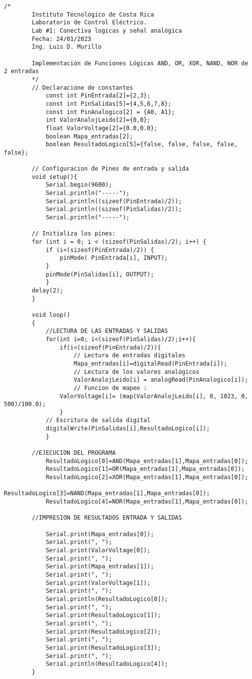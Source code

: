 {\scriptsize 
		
	\begin{lstlisting}[language=Arduino,numbers=none, showstringspaces=false]
		 /*
		Instituto Tecnológico de Costa Rica
		Laboratorio de Control Eléctrico.
		Lab #1: Conectiva logicas y señal analógica
		Fecha: 24/01/2023
		Ing. Luis D. Murillo
		
		Implementación de Funciones Lógicas AND, OR, XOR, NAND, NOR de 2 entradas
		*/
		// Declaracione de constantes
			const int PinEntrada[2]={2,3};
			const int PinSalidas[5]={4,5,6,7,8};
			const int PinAnalogico[2] = {A0, A1};
			int ValorAnalojLeido[2]={0,0};
			float ValorVoltage[2]={0.0,0.0};
			boolean Mapa_entradas[2];
			boolean ResultadoLogico[5]={false, false, false, false, false};
		
		// Configuracion de Pines de entrada y salida
		void setup(){
			Serial.begin(9600);
			Serial.println("-----");
			Serial.println((sizeof(PinEntrada)/2));
			Serial.println((sizeof(PinSalidas)/2));
			Serial.println("-----");
		
		// Initializa los pines:
		for (int i = 0; i < (sizeof(PinSalidas)/2); i++) {
			if (i<(sizeof(PinEntrada)/2)) {
				pinMode( PinEntrada[i], INPUT);
			}
			pinMode(PinSalidas[i], OUTPUT);
			}
		delay(2);
		}
		
		void loop()
		{		
			//LECTURA DE LAS ENTRADAS Y SALIDAS 	
			for(int i=0; i<(sizeof(PinSalidas)/2);i++){
				if(i<(sizeof(PinEntrada)/2)){
					// Lectura de entradas digitales
					Mapa_entradas[i]=digitalRead(PinEntrada[i]);
					// Lectura de los valores analógicos
					ValorAnalojLeido[i] = analogRead(PinAnalogico[i]);
					// Funcion de mapeo :
				ValorVoltage[i]= (map(ValorAnalojLeido[i], 0, 1023, 0, 500)/100.0);
				}
			// Escritura de salida digital
			digitalWrite(PinSalidas[i],ResultadoLogico[i]);
			}
		
		//EJECUCION DEL PROGRAMA
			ResultadoLogico[0]=AND(Mapa_entradas[1],Mapa_entradas[0]);
			ResultadoLogico[1]=OR(Mapa_entradas[1],Mapa_entradas[0]);
			ResultadoLogico[2]=XOR(Mapa_entradas[1],Mapa_entradas[0]);
			ResultadoLogico[3]=NAND(Mapa_entradas[1],Mapa_entradas[0]);
			ResultadoLogico[4]=NOR(Mapa_entradas[1],Mapa_entradas[0]);
		
		//IMPRESION DE RESULTADOS ENTRADA Y SALIDAS
		
			Serial.print(Mapa_entradas[0]);
			Serial.print(", ");
			Serial.print(ValorVoltage[0]);
			Serial.print(", ");
			Serial.print(Mapa_entradas[1]);
			Serial.print(", ");
			Serial.print(ValorVoltage[1]);
			Serial.print(", ");
			Serial.println(ResultadoLogico[0]);
			Serial.print(", ");
			Serial.print(ResultadoLogico[1]);
			Serial.print(", ");
			Serial.print(ResultadoLogico[2]);
			Serial.print(", ");
			Serial.print(ResultadoLogico[3]);
			Serial.print(", ");
			Serial.println(ResultadoLogico[4]);
		}
		

\end{lstlisting}}

